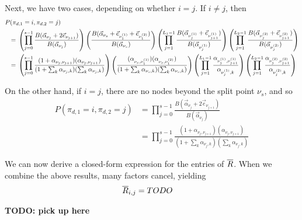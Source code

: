 \documentclass{article}
\theoremstyle{definition}
\begin{document}
Next, we have two cases, depending on whether $i = j$.
If $i \neq j$, then
\begin{align*}
\MoveEqLeft
P(\pi_{d,1} = i, \pi_{d,2} = j) \\
={}&
\left(
  \prod_{j=0}^{s-1}
  \frac{B(\vec\alpha_{\nu_j} + 2 \vec e_{\nu_{j+1}})}
       {B(\vec\alpha_{\nu_j})}
\right)
\left(
  \frac{B(\vec\alpha_{\nu_s} + \vec e_{\nu^{(1)}_{1}} + \vec e_{\nu^{(2)}_{1}})}
       {B(\vec\alpha_{\nu_s})}
\right)
\left(
  \prod_{j=1}^{L_1-1}
  \frac{B(\vec\alpha_{\nu^{(1)}_{j}} + \vec e_{\nu^{(1)}_{j+1}})}
       {B(\vec\alpha_{\nu^{(1)}_{j}})}
\right)
\left(
  \prod_{j=1}^{L_2-1}
  \frac{B(\vec\alpha_{\nu^{(2)}_{j}} + \vec e_{\nu^{(2)}_{j+1}})}
       {B(\vec\alpha_{\nu^{(2)}_{j}})}
\right)
\\
={}&
\left(
  \prod_{j=0}^{s-1}
  \frac{(1 + \alpha_{\nu_j,\nu_{j+1}}) (\alpha_{\nu_j,\nu_{j+1}})}
       {(1 + \sum_k \alpha_{\nu_j,k}) (\sum_k \alpha_{\nu_j,k})}
\right)
\left(
  \frac{(\alpha_{\nu_s,\nu^{(1)}_{1}}) (\alpha_{\nu_s,\nu^{(2)}_{1}})}
       {(1 + \sum_k \alpha_{\nu_s,k}) (\sum_k \alpha_{\nu_s,k})}
\right)
\left(
  \prod_{j=1}^{L_1-1}
  \frac{\alpha_{\nu^{(1)}_{j}, \nu^{(1)}_{j+1}}}
       {\alpha_{\nu^{(1)}_{j}, k}}
\right)
\left(
  \prod_{j=1}^{L_2-1}
  \frac{\alpha_{\nu^{(2)}_{j}, \nu^{(2)}_{j+1}}}
       {\alpha_{\nu^{(2)}_{j}, k}}
\right)
\end{align*}

On the other hand, if $i = j$, there are no nodes beyond the split point $\nu_s$, and so
\begin{align*}
P(\pi_{d,1} = i, \pi_{d,2} = j)
&=
  \prod_{j=0}^{s-1}
  \frac{B(\vec\alpha_{\nu_j} + 2 \vec e_{\nu_{j+1}})}
       {B(\vec\alpha_{\nu_j})}
\\
&=
\prod_{j=0}^{s-1}
\frac{(1 + \alpha_{\nu_j,\nu_{j+1}}) (\alpha_{\nu_j,\nu_{j+1}})}
     {(1 + \sum_k \alpha_{\nu_j,k}) (\sum_k \alpha_{\nu_j,k})}
\end{align*}

We can now derive a closed-form expression for the entries of $\overline{R}$.
When we combine the above results, many factors cancel, yielding
\begin{align}
\overline{R}_{i,j}
&=
TODO
\label{eqn:closedFormRbar}
\end{align}

\par {\bf TODO: pick up here} \par
\end{document}
